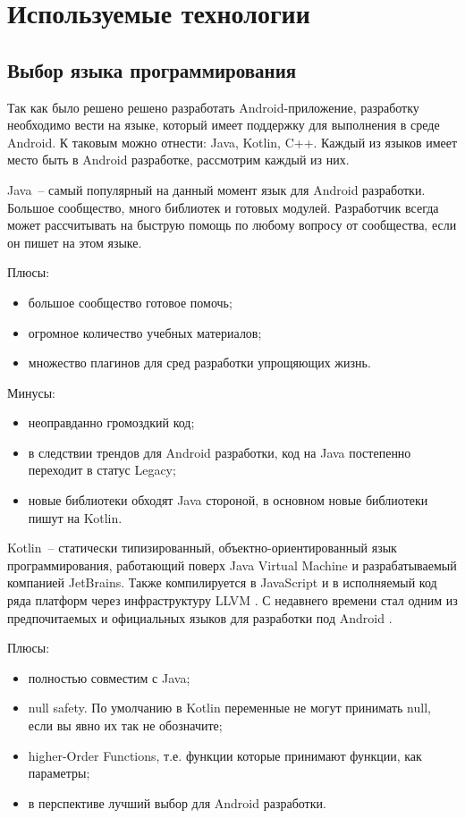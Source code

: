 \section{Используемые технологии}
\label{sec:practice:technology_used}

\subsection{Выбор языка программирования}
Так как было решено решено разработать Android-приложение, разработку необходимо вести на языке, который имеет поддержку для выполнения в среде Android. К таковым можно отнести: Java, Kotlin, C++. Каждый из языков имеет место быть в Android разработке, рассмотрим каждый из них.

Java~-- самый популярный на данный момент язык для Android разработки. Большое сообщество, много библиотек и готовых модулей. Разработчик всегда может рассчитывать на быструю помощь по любому вопросу от сообщества, если он пишет на этом языке.

Плюсы:
\begin{itemize}
 \item большое сообщество готовое помочь;
 \item огромное количество учебных материалов;
 \item множество плагинов для сред разработки упрощяющих жизнь.
\end{itemize}

Минусы:
\begin{itemize}
 \item неоправданно громоздкий код;
 \item в следствии трендов для Android разработки, код на Java постепенно переходит в статус Legacy;
 \item новые библиотеки обходят Java стороной, в основном новые библиотеки пишут на Kotlin.
\end{itemize}
 
Kotlin~-- статически типизированный, объектно-ориентированный язык программирования, работающий поверх Java Virtual Machine и разрабатываемый компанией JetBrains. Также компилируется в JavaScript и в исполняемый код ряда платформ через инфраструктуру LLVM \cite{kotlin1}. С недавнего времени стал одним из предпочитаемых и официальных языков для разработки под Android \cite{web2}.

Плюсы:
\begin{itemize}
 \item полностью совместим с Java;
 \item null safety. По умолчанию в Kotlin переменные не могут принимать null, если вы явно их так не обозначите;
 \item higher-Order Functions, т.е. функции которые принимают функции, как параметры;
 \item в перспективе лучший выбор для Android разработки.
\end{itemize}

